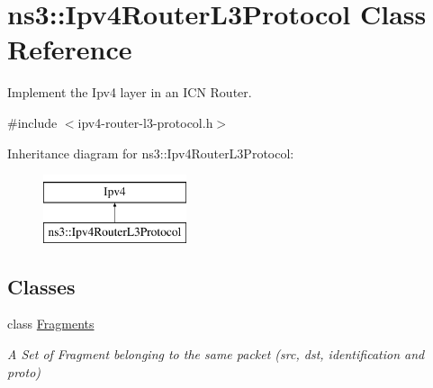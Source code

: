 \hypertarget{classns3_1_1Ipv4RouterL3Protocol}{\section{ns3\-:\-:Ipv4\-Router\-L3\-Protocol Class Reference}
\label{classns3_1_1Ipv4RouterL3Protocol}
}


Implement the Ipv4 layer in an I\-C\-N Router.  




{\ttfamily \#include $<$ipv4-\/router-\/l3-\/protocol.\-h$>$}

Inheritance diagram for ns3\-:\-:Ipv4\-Router\-L3\-Protocol\-:\begin{figure}[H]
\begin{center}
\leavevmode
\includegraphics[height=2.000000cm]{classns3_1_1Ipv4RouterL3Protocol}
\end{center}
\end{figure}
\subsection*{Classes}
\begin{DoxyCompactItemize}
\item 
class \hyperlink{classns3_1_1Ipv4RouterL3Protocol_1_1Fragments}{Fragments}
\begin{DoxyCompactList}\small\item\em A Set of Fragment belonging to the same packet (src, dst, identification and proto) \end{DoxyCompactList}\end{DoxyCompactItemize}
